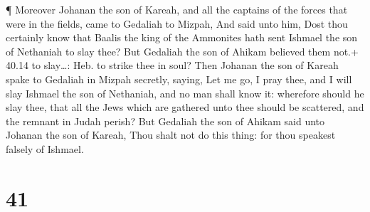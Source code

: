  ¶ Moreover Johanan the son of Kareah, and all the captains
of the forces that were in the fields, came to Gedaliah to Mizpah,
 And said unto him, Dost thou certainly know that Baalis
the king of the Ammonites hath sent Ishmael the son of Nethaniah to slay
thee? But Gedaliah the son of Ahikam believed them not.+ 40.14 to
slay\ldots: Heb. to strike thee in soul?  Then Johanan the
son of Kareah spake to Gedaliah in Mizpah secretly, saying, Let me go, I
pray thee, and I will slay Ishmael the son of Nethaniah, and no man
shall know it: wherefore should he slay thee, that all the Jews which
are gathered unto thee should be scattered, and the remnant in Judah
perish?  But Gedaliah the son of Ahikam said unto Johanan
the son of Kareah, Thou shalt not do this thing: for thou speakest
falsely of Ishmael.

\hypertarget{section-40}{%
\section{41}\label{section-40}}

